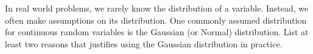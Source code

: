 In real world problems, we rarely know the distribution of a variable. Instead, we often make assumptions on its distribution. One commonly assumed distribution for continuous random variables is the Gaussian (or Normal) distribution. List at least two reasons that justifies using the Gaussian distribution in practice.

\smallspace

